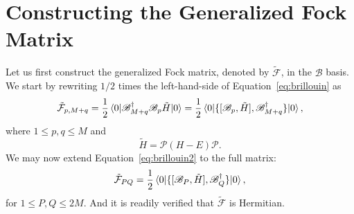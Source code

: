 \documentclass[11pt,letterpaper]{article}
\begin{document}
\section{Constructing the Generalized Fock Matrix}

Let us first construct the generalized Fock matrix, denoted by $\tilde{\mathcal{F}}$,
in the $\mathscr{B}$ basis. We start by rewriting $1/2$ times the left-hand-side of
Equation~\eqref{eq:brillouin} as
\begin{align}
  \label{eq:brillouin2}
  \tilde{\mathcal{F}}_{p, M+q}
  = \frac{1}{2} \braket{0|\mathscr{B}^\dag_{M+q} \mathscr{B}_p \tilde{H}|0}
  = \frac{1}{2} \braket{0|\{[\mathscr{B}_p, \tilde{H}], \mathscr{B}^\dag_{M+q}\}|0},
\end{align}
where $1 \leq p, q \leq M$ and
\begin{equation}
  \tilde{H} = \mathcal{P}  (H - E) \mathcal{P}.
\end{equation}
We may now extend Equation~\eqref{eq:brillouin2} to the full matrix:
\begin{equation}
  \tilde{\mathcal{F}}_{PQ}
  = \frac{1}{2} \braket{0|\{[\mathscr{B}_P, \tilde{H}], \mathscr{B}^\dag_Q\}|0},
\end{equation}
for $1 \leq P, Q \leq 2M$. And it is readily verified that $\tilde{\mathcal{F}}$ is Hermitian.
\end{document}
